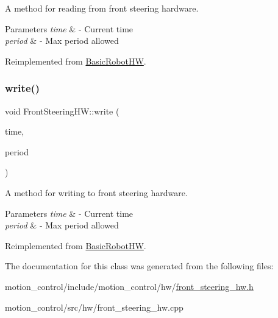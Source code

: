 A method for reading from front steering hardware. 


\begin{DoxyParams}{Parameters}
{\em time} & -\/ Current time \\
\hline
{\em period} & -\/ Max period allowed \\
\hline
\end{DoxyParams}


Reimplemented from \hyperlink{classBasicRobotHW_a4246adb060fa49a3eb9d5d26845b6425}{Basic\+Robot\+HW}.

\mbox{\label{classFrontSteeringHW_aa0e57cc4919044aecb7d1c76c8d4ac21}} 
\subsubsection{\texorpdfstring{write()}{write()}}
{\footnotesize\ttfamily void Front\+Steering\+H\+W\+::write (\begin{DoxyParamCaption}\item[{const ros\+::\+Time \&}]{time,  }\item[{const ros\+::\+Duration \&}]{period }\end{DoxyParamCaption})\hspace{0.3cm}{\ttfamily [virtual]}}



A method for writing to front steering hardware. 


\begin{DoxyParams}{Parameters}
{\em time} & -\/ Current time \\
\hline
{\em period} & -\/ Max period allowed \\
\hline
\end{DoxyParams}


Reimplemented from \hyperlink{classBasicRobotHW_a62add5eabfca2f88a5035db8b8240bb3}{Basic\+Robot\+HW}.



The documentation for this class was generated from the following files\+:\begin{DoxyCompactItemize}
\item 
motion\+\_\+control/include/motion\+\_\+control/hw/\hyperlink{front__steering__hw_8h}{front\+\_\+steering\+\_\+hw.\+h}\item 
motion\+\_\+control/src/hw/front\+\_\+steering\+\_\+hw.\+cpp\end{DoxyCompactItemize}
